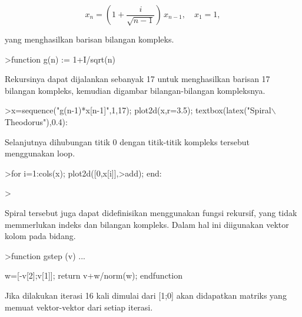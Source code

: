 \documentclass{article}
\begin{document}
\begin{eulernotebook}
\begin{eulercomment}
\begin{eulercomment}
\begin{eulercomment}
\begin{eulercomment}
\begin{eulercomment}
\begin{eulercomment}
\begin{eulercomment}
\end{eulercomment}
\begin{eulerformula}
\[
x_n = \left( 1 + \frac{i}{\sqrt{n-1}} \right) \, x_{n-1}, \quad x_1=1,
\]
\end{eulerformula}
\begin{eulercomment}
yang menghasilkan barisan bilangan kompleks.
\end{eulercomment}
\begin{eulerprompt}
>function g(n) := 1+I/sqrt(n)
\end{eulerprompt}
\begin{eulercomment}
Rekursinya dapat dijalankan sebanyak 17 untuk menghasilkan barisan 17 bilangan kompleks,
kemudian digambar bilangan-bilangan kompleksnya.
\end{eulercomment}
\begin{eulerprompt}
>x=sequence("g(n-1)*x[n-1]",1,17); plot2d(x,r=3.5); textbox(latex("Spiral\(\backslash\) Theodorus"),0.4):
\end{eulerprompt}
\begin{eulercomment}
Selanjutnya dihubungan titik 0 dengan titik-titik kompleks tersebut menggunakan loop.
\end{eulercomment}
\begin{eulerprompt}
>for i=1:cols(x); plot2d([0,x[i]],>add); end:
\end{eulerprompt}
\begin{eulerprompt}
> 
\end{eulerprompt}
\begin{eulercomment}
Spiral tersebut juga dapat didefinisikan menggunakan fungsi rekursif, yang tidak memmerlukan
indeks dan bilangan kompleks. Dalam hal ini diigunakan vektor kolom pada bidang.
\end{eulercomment}
\begin{eulerprompt}
>function gstep (v) ...
\end{eulerprompt}
\begin{eulerudf}
  w=[-v[2];v[1]];
  return v+w/norm(w);
  endfunction
\end{eulerudf}
\begin{eulercomment}
Jika dilakukan iterasi 16 kali dimulai dari [1;0] akan didapatkan matriks yang memuat
vektor-vektor dari setiap iterasi.
\end{eulercomment}
\begin{eulerprompt}

\end{eulerprompt}
\end{eulercomment}
\end{eulercomment}
\end{eulercomment}
\end{eulercomment}
\end{eulercomment}
\end{eulercomment}
\end{eulernotebook}
\end{document}
